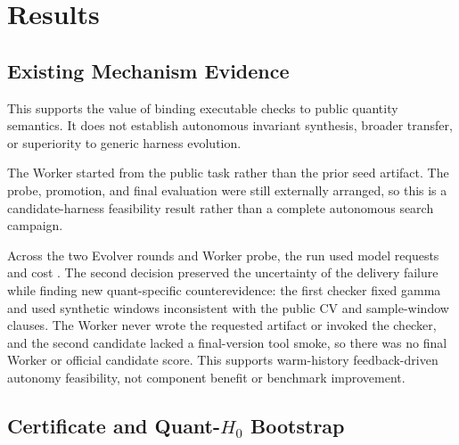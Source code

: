 \section{Results}



\subsection{Existing Mechanism Evidence}

 This supports the value
of binding executable checks to public quantity semantics. It does not establish
autonomous invariant synthesis, broader transfer, or superiority to generic
harness evolution.

 The Worker started from the public
task rather than the prior seed artifact. The probe, promotion, and final
evaluation were still externally arranged, so this is a candidate-harness
feasibility result rather than a complete autonomous search campaign.

 Across the two Evolver rounds
and Worker probe, the run used \APTwoMRequests{} model requests and cost
\APTwoMCost{}. The second decision preserved the uncertainty of the delivery
failure while finding new quant-specific counterevidence: the first checker
fixed gamma and used synthetic windows inconsistent with the public CV and
sample-window clauses. The Worker never wrote the requested artifact or
invoked the checker, and the second candidate lacked a final-version tool
smoke, so there was no final Worker or official candidate score. This supports
warm-history feedback-driven autonomy feasibility, not component benefit or
benchmark improvement.

\subsection{Certificate and Quant-$H_0$ Bootstrap}

